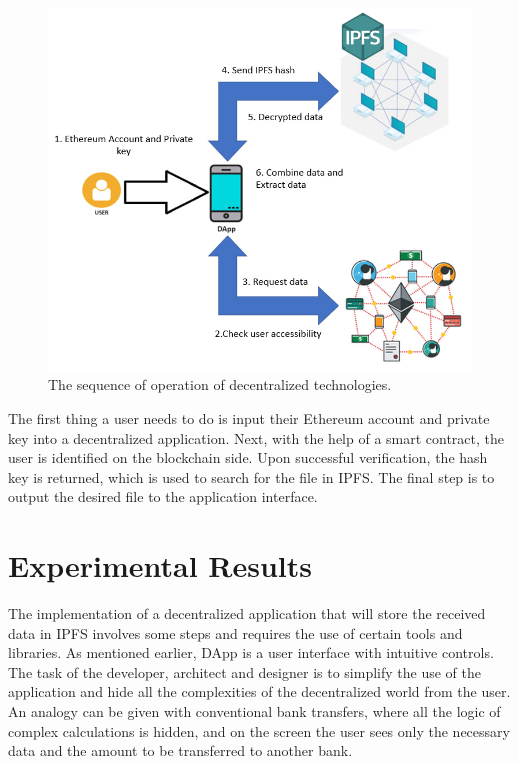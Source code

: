 \documentclass[10pt,conference,a4paper]{IEEEtran_EDM}
\begin{document}
\begin{figure}
\centerline{\includegraphics[scale=0.67]{fig2.png}}
\caption{The sequence of operation of decentralized technologies.}
\label{Sequence}
\end{figure}

The first thing a user needs to do is input their Ethereum account and private key into a decentralized application.
Next, with the help of a smart contract, the user is identified on the blockchain side.
Upon successful verification, the hash key is returned, which is used to search for the file in IPFS.
The final step is to output the desired file to the application interface.

\section{Experimental Results}
The implementation of a decentralized application that will store the received data in IPFS involves some steps and requires the use of certain tools and libraries.
As mentioned earlier, DApp is a user interface with intuitive controls.
The task of the developer, architect and designer is to simplify the use of the application and hide all the complexities of the decentralized world from the user.
An analogy can be given with conventional bank transfers, where all the logic of complex calculations is hidden, and on the screen the user sees only the necessary data and the amount to be transferred to another bank.
\end{document}
